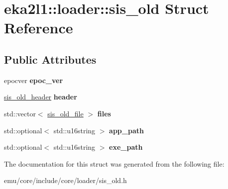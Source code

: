 \hypertarget{structeka2l1_1_1loader_1_1sis__old}{}\section{eka2l1\+:\+:loader\+:\+:sis\+\_\+old Struct Reference}
\label{structeka2l1_1_1loader_1_1sis__old}
\subsection*{Public Attributes}
\begin{DoxyCompactItemize}
\item 
\mbox{\label{structeka2l1_1_1loader_1_1sis__old_a9f6fdfdc1b8ea915311b532a4f381b83}} 
epocver {\bfseries epoc\+\_\+ver}
\item 
\mbox{\label{structeka2l1_1_1loader_1_1sis__old_aadd28389a0dae34e50343ccf79678816}} 
\mbox{\hyperlink{structeka2l1_1_1loader_1_1sis__old__header}{sis\+\_\+old\+\_\+header}} {\bfseries header}
\item 
\mbox{\label{structeka2l1_1_1loader_1_1sis__old_aa0030019696b6fb9babd2091f33ebdb9}} 
std\+::vector$<$ \mbox{\hyperlink{structeka2l1_1_1loader_1_1sis__old__file}{sis\+\_\+old\+\_\+file}} $>$ {\bfseries files}
\item 
\mbox{\label{structeka2l1_1_1loader_1_1sis__old_a8d0cd60d7bd98b71ab1befe6e5ccbf84}} 
std\+::optional$<$ std\+::u16string $>$ {\bfseries app\+\_\+path}
\item 
\mbox{\label{structeka2l1_1_1loader_1_1sis__old_ac921e5d82d3f085e42c8b6f785da5b46}} 
std\+::optional$<$ std\+::u16string $>$ {\bfseries exe\+\_\+path}
\end{DoxyCompactItemize}


The documentation for this struct was generated from the following file\+:\begin{DoxyCompactItemize}
\item 
emu/core/include/core/loader/sis\+\_\+old.\+h\end{DoxyCompactItemize}
